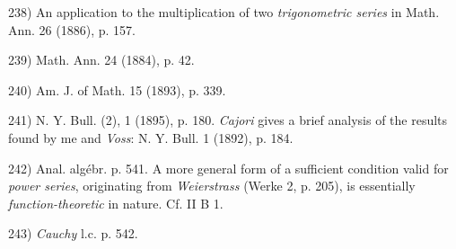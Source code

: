 \vfill
\leftline{\rule{2in}{0.4pt}}
\vspace{0.2cm}
{
\footnotesize
238) An application to the multiplication of two \textit{trigonometric series} in Math. Ann. 26 (1886), p. 157.

239) Math. Ann. 24 (1884), p. 42.

240) Am. J. of Math. 15 (1893), p. 339.

241) N. Y. Bull. (2), 1 (1895), p. 180. \textit{Cajori} gives a brief analysis of the results found by me and \textit{Voss}: N. Y. Bull. 1 (1892), p. 184.

242) Anal. algébr. p. 541. A more general form of a sufficient condition valid for \textit{power series}, originating from \textit{Weierstrass} (Werke 2, p. 205), is essentially \textit{function-theoretic} in nature. Cf. II B 1.

243) \textit{Cauchy} l.c. p. 542.

}
